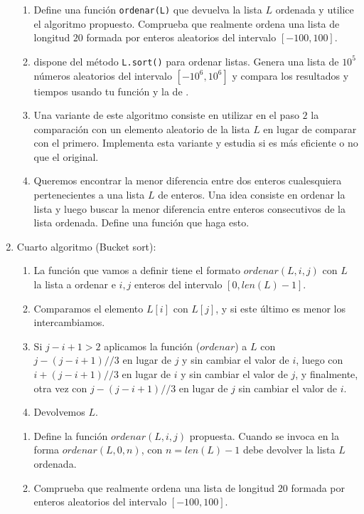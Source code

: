 \begin{enumerate}
\begin{enumerate}
\end{enumerate}

\begin{ejer}
\begin{enumerate}
\item Define una función \lstinline$ordenar(L)$ que devuelva la lista $L$
ordenada y utilice el algoritmo propuesto. Comprueba que realmente ordena una
lista 
de longitud $20$ formada por enteros aleatorios del intervalo $[-100,100].$
\item {\sage} dispone del método \lstinline$L.sort()$ para ordenar listas.
Genera una lista de $10^5$ números aleatorios del intervalo $[-10^6,10^6]$ y
compara 
los resultados y tiempos usando tu función y la de {\sage}. 
 \item    Una variante de este algoritmo consiste en utilizar en el paso $2$ la
comparación con un elemento aleatorio de la lista $L$ en lugar de comparar con
el primero.  Implementa esta variante y estudia si es más eficiente o no que el
original.
 \item    Queremos encontrar la menor diferencia entre dos enteros cualesquiera
pertenecientes a una lista $L$ de enteros. Una idea consiste en  ordenar la
lista y luego buscar la menor diferencia entre enteros consecutivos de la lista
ordenada. Define una función que haga esto.

 \end{enumerate}
 \end{ejer}

\item{\sc Cuarto algoritmo (Bucket sort):} 
\begin{enumerate}
\item La función que vamos a definir tiene el formato $ordenar(L,i,j)$ con $L$ la lista a ordenar e $i,j$ enteros del intervalo $[0,len(L)-1].$
\item Comparamos el elemento $L[i]$ con $L[j]$, y si este último es menor los intercambiamos. 
\item Si $j-i+1>2$ aplicamos la función ($ordenar$) a $L$  con $j-(j-i+1)//3$ en lugar de $j$ y sin cambiar el valor de $i$, luego con $i+(j-i+1)//3$  en lugar de $i$ y sin cambiar el valor de $j$,  y finalmente, otra vez con $j-(j-i+1)//3$ en lugar de $j$ sin cambiar el valor de $i$.
 \item    Devolvemos $L$.

\end{enumerate}
\begin{ejer}
  \begin{enumerate}
  \item   Define la función $ordenar(L,i,j)$ propuesta. Cuando se invoca en la forma $ordenar(L,0,n)$, con $n=len(L)-1$ debe devolver la lista $L$ ordenada. 
    \item Comprueba que realmente ordena una lista  de longitud $20$ formada por enteros aleatorios del intervalo $[-100,100].$
    

\end{enumerate}
\end{ejer}
\end{enumerate}
